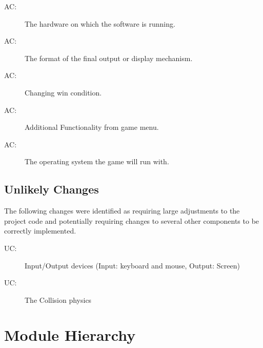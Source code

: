 \documentclass[12pt, titlepage]{article}
\newcounter{acnum}
\newcommand{\actheacnum}{AC\theacnum}
\newcounter{ucnum}
\newcommand{\uctheucnum}{UC\theucnum}
\begin{document}
\begin{description}
\item[ \actheacnum \label{acHardware}:] The hardware on which the software is running. 
\item[ \actheacnum \label{acInput}:]  The format of the final output or display mechanism.
\item[ \actheacnum \label{acParams}:] Changing win condition. 
\item[ \actheacnum \label{acVerify}:] Additional Functionality from game menu. 
\item[ \actheacnum \label{acOutput}:] The operating system the game will run with. 
\end{description}
\subsection{Unlikely Changes} \label{SecUchange}
The following changes were identified as requiring large adjustments to the project code and potentially requiring changes to several other components to be correctly implemented.

\begin{description}
\item[ \uctheucnum \label{ucIO}:] Input/Output devices (Input: keyboard and mouse, Output: Screen)
\item[ \uctheucnum \label{ucInput}:] The Collision physics
\end{description}
\section{Module Hierarchy} \label{SecMH}
\end{document}
